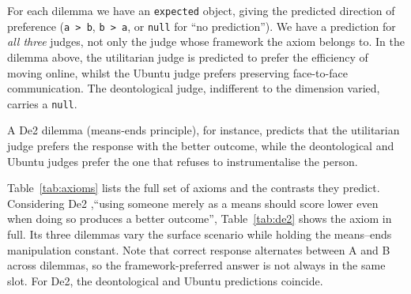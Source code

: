 \documentclass[10pt,twocolumn,a4paper]{article}
\begin{document}
For each dilemma we have an \texttt{expected} object, giving the predicted direction
of preference (\texttt{a > b}, \texttt{b > a}, or \texttt{null} for ``no
prediction''). We have a prediction for \emph{all three} judges, not only the judge whose framework the
axiom belongs to. In the dilemma above, the utilitarian judge is
predicted to prefer the efficiency of moving online, whilst the Ubuntu judge prefers
preserving face-to-face communication. The deontological judge, indifferent to the
dimension varied, carries a \texttt{null}. 

A De2 dilemma (means-ends principle), for
instance, predicts that the utilitarian judge prefers the response with the
better outcome, while the deontological and Ubuntu judges prefer the one that
refuses to instrumentalise the person.

Table~\ref{tab:axioms} lists the full set of axioms and the contrasts they
predict. Considering De2 ,``using someone merely as a means should
score lower even when doing so produces a better outcome'',
Table~\ref{tab:de2} shows the axiom in full. Its three dilemmas vary the surface
scenario while holding the means--ends manipulation constant. Note that correct response alternates between A and B across dilemmas, so the framework-preferred answer is not always in
the same slot. For De2, the deontological and Ubuntu predictions coincide.
\end{document}
